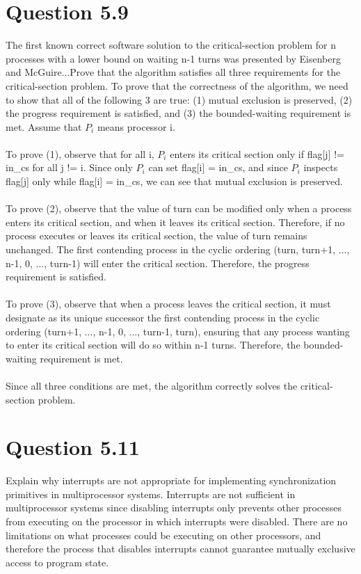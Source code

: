 \documentclass[12pt]{article}
\begin{document}
\section*{Question 5.9} {\color{blue}The first known correct software solution to the critical-section problem for n processes with a lower bound on waiting n-1 turns was presented by Eisenberg and McGuire...Prove that the algorithm satisfies all three requirements for the critical-section problem.} To prove that the correctness of the algorithm, we need to show that all of the following 3 are true: (1) mutual exclusion is preserved, (2) the progress requirement is satisfied, and (3) the bounded-waiting requirement is met. Assume that $P_{i}$ means processor i.
\\ \\
To prove (1), observe that for all i, $P_{i}$ enters its critical section only if flag[j] != in\_cs for all j != i. Since only $P_{i}$ can set flag[i] = in\_cs, and since $P_{i}$ inspects flag[j] only while flag[i] = in\_cs, we can see that mutual exclusion is preserved.
\\ \\
To prove (2), observe that the value of turn can be modified only when a process enters its critical section, and when it leaves its critical section. Therefore, if no process executes or leaves its critical section, the value of turn remains unchanged. The first contending process in the cyclic ordering (turn, turn+1, ..., n-1, 0, ..., turn-1) will enter the critical section. Therefore, the progress requirement is satisfied.
\\ \\
To prove (3), observe that when a process leaves the critical section, it must designate as its unique successor the first contending process in the cyclic ordering (turn+1, ..., n-1, 0, ..., turn-1, turn), ensuring that any process wanting to enter its critical section will do so within n-1 turns. Therefore, the bounded-waiting requirement is met.
\\ \\
Since all three conditions are met, the algorithm correctly solves the critical-section problem.

\section*{Question 5.11} {\color{blue}Explain why interrupts are not appropriate for implementing synchronization primitives in multiprocessor systems.} 
Interrupts are not sufficient in multiprocessor systems since disabling interrupts only prevents other processes from executing on the processor in which interrupts were disabled. There are no limitations on what processes could be executing on other processors, and therefore the process that disables interrupts cannot guarantee mutually exclusive access to program state.
\end{document}
